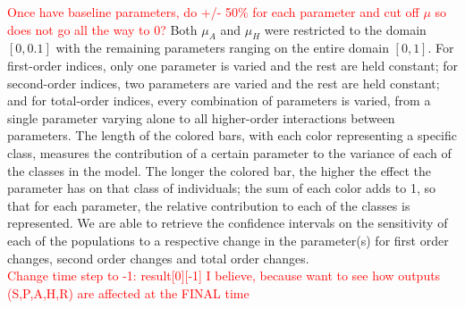 \documentclass[12pt]{article}
\begin{document}
\textcolor{red}{Once have baseline parameters, do +/- 50\% for each parameter and cut off $\mu$ so does not go all the way to 0?}
Both $\mu_{A}$ and $\mu_{H}$ were restricted to the domain $[0,0.1]$ with the remaining parameters ranging on the entire domain $[0,1]$. For first-order indices, only one parameter is varied and the rest are held constant; for second-order indices, two parameters are varied and the rest are held constant; and for total-order indices, every combination of parameters is varied, from a single parameter varying alone to all higher-order interactions between parameters. The length of the colored bars, with each color representing a specific class, measures the contribution of a certain parameter to the variance of each of the classes in the model. The longer the colored bar, the higher the effect the parameter has on that class of individuals; the sum of each color adds to 1, so that for each parameter, the relative contribution to each of the classes is represented. We are able to retrieve the confidence intervals on the sensitivity of each of the populations to a respective change in the parameter(s) for first order changes, second order changes and total order changes. \\
\textcolor{red}{Change time step to -1: result[0][-1] I believe, because want to see how outputs (S,P,A,H,R) are affected at the FINAL time}


\pagebreak



\end{document}
